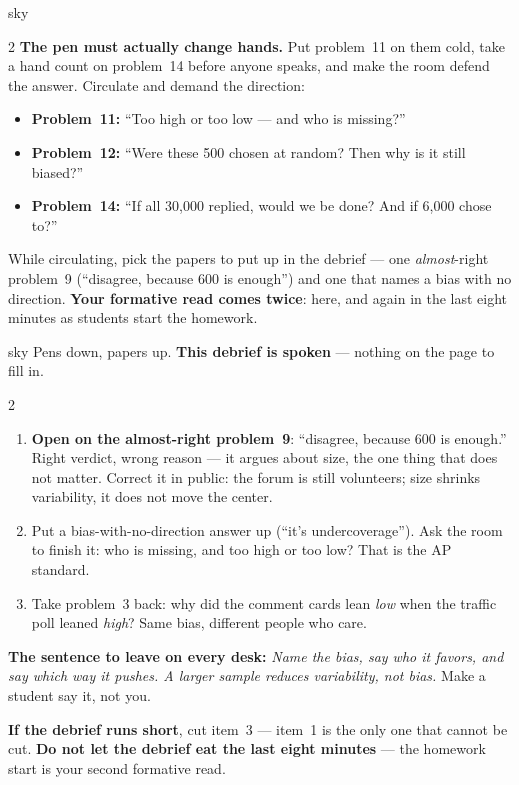 \documentclass[10pt]{article}
\begin{document}
\begin{skillbox}{sky}
\begin{multicols}{2}
\textbf{The pen must actually change hands.} Put problem~11 on them cold, take a hand count on
problem~14 before anyone speaks, and make the room defend the answer. Circulate and demand the
direction:
\begin{itemize}[leftmargin=1.1em, nosep]
  \item \textbf{Problem~11:} ``Too high or too low --- and who is missing?''
  \item \textbf{Problem~12:} ``Were these 500 chosen at random? Then why is it still biased?''
  \item \textbf{Problem~14:} ``If all 30{,}000 replied, would we be done? And if 6{,}000
        chose to?''
\end{itemize}
While circulating, pick the papers to put up in the debrief --- one \emph{almost}-right
problem~9 (``disagree, because 600 is enough'') and one that names a bias with no direction.
\textbf{Your formative read comes twice}: here, and again in the last eight minutes as students
start the homework.
\end{multicols}
\end{skillbox}

\boxguard
\begin{skillbox}{sky}
Pens down, papers up. \textbf{This debrief is spoken} --- nothing on the page to fill in.
\begin{multicols}{2}
\begin{enumerate}[leftmargin=1.3em, nosep, itemsep=3pt]
  \item \textbf{Open on the almost-right problem~9}: ``disagree, because 600 is enough.'' Right
        verdict, wrong reason --- it argues about size, the one thing that does not matter.
        Correct it in public: the forum is still volunteers; size shrinks variability, it
        does not move the center.
  \item Put a bias-with-no-direction answer up (``it's undercoverage''). Ask the room to finish
        it: who is missing, and too high or too low? That is the AP standard.
  \item Take problem~3 back: why did the comment cards lean \emph{low} when the traffic poll
        leaned \emph{high}? Same bias, different people who care.
\end{enumerate}
\columnbreak
\textbf{The sentence to leave on every desk:} \emph{Name the bias, say who it favors, and say
which way it pushes. A larger sample reduces variability, not bias.} Make a student say it,
not you.

\textbf{If the debrief runs short}, cut item~3 --- item~1 is the only one that cannot be cut.
\textbf{Do not let the debrief eat the last eight minutes} --- the homework start is your
second formative read.
\end{multicols}
\end{skillbox}
\end{document}
